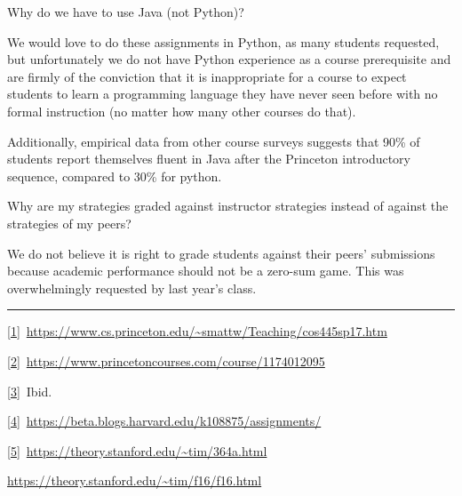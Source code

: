 \documentclass[]{article}
\begin{document}
{Why do we have to use Java (not Python)?}

{We would love to do these assignments in Python, as many students
requested, but unfortunately we do not have Python experience as a
course prerequisite and are firmly of the conviction that it is
inappropriate for a course to expect students to learn a programming
language they have never seen before with no formal instruction (no
matter how many other courses do that).}

{Additionally, empirical data from other course surveys suggests that
90\% of students report themselves fluent in Java after the Princeton
introductory sequence, compared to 30\% for python.}

{Why are my strategies graded against instructor strategies instead of
against the strategies of my peers?}

{We do not believe it is right to grade students against their peers'
submissions because academic performance should not be a zero-sum game.
This was overwhelmingly requested by last year's class.}

\begin{center}\rule{0.5\linewidth}{\linethickness}\end{center}

\protect\hyperlink{ftnt_ref1}{{[}1{]}}{~}{\href{https://www.google.com/url?q=https://www.cs.princeton.edu/~smattw/Teaching/cos445sp17.htm\&sa=D\&ust=1522867200381000}{https://www.cs.princeton.edu/\textasciitilde{}smattw/Teaching/cos445sp17.htm}}

\protect\hyperlink{ftnt_ref2}{{[}2{]}}{~}{\href{https://www.google.com/url?q=https://www.princetoncourses.com/course/1174012095\&sa=D\&ust=1522867200381000}{https://www.princetoncourses.com/course/1174012095}}

\protect\hyperlink{ftnt_ref3}{{[}3{]}}{~Ibid.}

\protect\hyperlink{ftnt_ref4}{{[}4{]}}{~}{\href{https://www.google.com/url?q=https://beta.blogs.harvard.edu/k108875/assignments/\&sa=D\&ust=1522867200386000}{https://beta.blogs.harvard.edu/k108875/assignments/}}

\protect\hyperlink{ftnt_ref5}{{[}5{]}}{~}{\href{https://www.google.com/url?q=https://theory.stanford.edu/~tim/364a.html\&sa=D\&ust=1522867200382000}{https://theory.stanford.edu/\textasciitilde{}tim/364a.html}}

{\href{https://www.google.com/url?q=https://theory.stanford.edu/~tim/f16/f16.html\&sa=D\&ust=1522867200382000}{https://theory.stanford.edu/\textasciitilde{}tim/f16/f16.html}}
\end{document}
